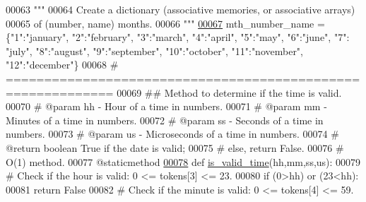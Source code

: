 \begin{DoxyCode}
00063     \textcolor{stringliteral}{"""}
00064 \textcolor{stringliteral}{        Create a dictionary (associative memories, or associative arrays)}
00065 \textcolor{stringliteral}{            of (number, name) months.}
00066 \textcolor{stringliteral}{    """}
\hypertarget{date__time__processing_8py_source_l00067}{}\hyperlink{classutilities_1_1date__time__processing_1_1date__time__operations_a640d6fe5b1045e4c92057b524264295d}{00067}     mth\_number\_name = \{\textcolor{stringliteral}{"1"}:\textcolor{stringliteral}{"january"}, \textcolor{stringliteral}{"2"}:\textcolor{stringliteral}{"february"}, \textcolor{stringliteral}{"3"}:\textcolor{stringliteral}{"march"}, \textcolor{stringliteral}{"4"}:\textcolor{stringliteral}{"april"}, \textcolor{stringliteral}{"5"}:\textcolor{stringliteral}{"may"}, \textcolor{stringliteral}{"6"}:\textcolor{stringliteral}{"june"}, \textcolor{stringliteral}{"7"}:\textcolor{stringliteral}{
      "july"}, \textcolor{stringliteral}{"8"}:\textcolor{stringliteral}{"august"}, \textcolor{stringliteral}{"9"}:\textcolor{stringliteral}{"september"}, \textcolor{stringliteral}{"10"}:\textcolor{stringliteral}{"october"}, \textcolor{stringliteral}{"11"}:\textcolor{stringliteral}{"november"}, \textcolor{stringliteral}{"12"}:\textcolor{stringliteral}{"december"}\}
00068     \textcolor{comment}{# ============================================================}
00069     \textcolor{comment}{##  Method to determine if the time is valid.}
00070     \textcolor{comment}{#   @param hh - Hour of a time in numbers.}
00071     \textcolor{comment}{#   @param mm - Minutes of a time in numbers.}
00072     \textcolor{comment}{#   @param ss - Seconds of a time in numbers.}
00073     \textcolor{comment}{#   @param us - Microseconds of a time in numbers.}
00074     \textcolor{comment}{#   @return boolean True if the date is valid;}
00075     \textcolor{comment}{#       else, return False.}
00076     \textcolor{comment}{#   O(1) method.}
00077     @staticmethod
\hypertarget{date__time__processing_8py_source_l00078}{}\hyperlink{classutilities_1_1date__time__processing_1_1date__time__operations_aaa8f94503a00886b6ca54e79c5ac2e84}{00078}     \textcolor{keyword}{def }\hyperlink{classutilities_1_1date__time__processing_1_1date__time__operations_aaa8f94503a00886b6ca54e79c5ac2e84}{is\_valid\_time}(hh,mm,ss,us):
00079         \textcolor{comment}{# Check if the hour is valid: 0 <= tokens[3] <= 23.}
00080         \textcolor{keywordflow}{if} (0>hh) \textcolor{keywordflow}{or} (23<hh):
00081             \textcolor{keywordflow}{return} \textcolor{keyword}{False}
00082         \textcolor{comment}{# Check if the minute is valid: 0 <= tokens[4] <= 59.}

\end{DoxyCode}
